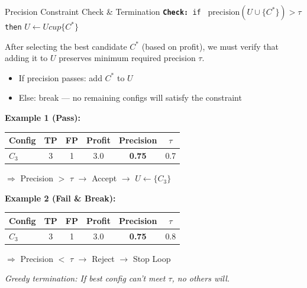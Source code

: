 \documentclass[8pt]{beamer} %
\begin{document}
\begin{frame}{Precision Constraint Check \& Termination}
	\texttt{\textbf{Check:} if } $\text{precision}(U \cup \{C^*\}) > \tau$ \texttt{ then}  
	\quad \texttt{$U \leftarrow U cup \{C^*\}$}
	
	\vspace{0.5em}
	After selecting the best candidate $C^*$ (based on profit), we must verify that adding it to $U$ preserves minimum required precision $\tau$.
	
	\begin{itemize}
		\item If precision passes: add $C^*$ to $U$
		\item Else: break — no remaining configs will satisfy the constraint
	\end{itemize}
	
	\vspace{1em}
	\textbf{Example 1 (Pass):}
	\begin{tabular}{lccccc}
		Config & TP & FP & Profit & Precision & $\tau$ \\
		\hline
		$C_3$ & 3 & 1 & 3.0 & \textbf{0.75} & 0.7 \\
	\end{tabular}
	
	\vspace{0.5em}
	$\Rightarrow$ Precision $>$ $\tau$ $\rightarrow$ Accept $\rightarrow$ $U \leftarrow \{C_3\}$
	
	\vspace{1em}
	\textbf{Example 2 (Fail \& Break):}
	\begin{tabular}{lccccc}
		Config & TP & FP & Profit & Precision & $\tau$ \\
		\hline
		$C_3$ & 3 & 1 & 3.0 & \textbf{0.75} & 0.8 \\
	\end{tabular}
	
	\vspace{0.5em}
	$\Rightarrow$ Precision $<$ $\tau$ $\rightarrow$ Reject $\rightarrow$ Stop Loop
	
	\textit{Greedy termination: If best config can’t meet $\tau$, no others will.}
\end{frame}
\end{document}
